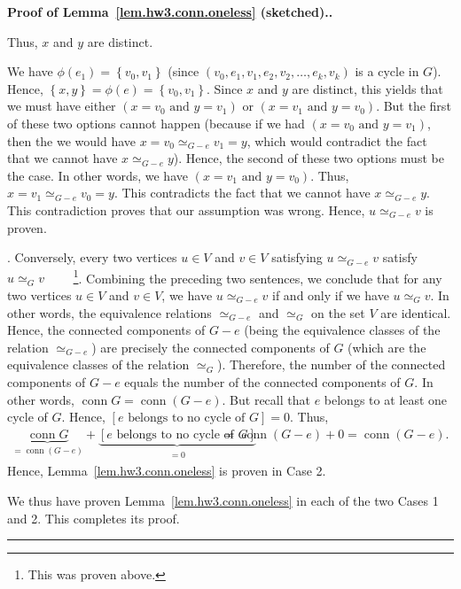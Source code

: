 \documentclass[numbers=enddot,12pt,final,onecolumn,notitlepage]{scrartcl}%
\theoremstyle{definition}
\newenvironment{proof}[1][Proof]{\noindent\textbf{#1.} }{\ \rule{0.5em}{0.5em}}
\newcommand{\conn}{\operatorname{conn}}
\newcommand{\set}[1]{\left\{ #1 \right\}}
\newcommand{\tup}[1]{\left( #1 \right)}
\newcommand{\ive}[1]{\left[ #1 \right]}
\newcommand{\underbrack}[2]{\underbrace{#1}_{\substack{#2}}}
\begin{document}
\begin{proof}[Proof of Lemma~\ref{lem.hw3.conn.oneless} (sketched).]
\begin{itemize}
{        Thus, $x$ and $y$ are distinct.
        \par We have $\phi\tup{e_1} = \set{v_0, v_1}$ (since
        $\tup{v_0, e_1, v_1, e_2, v_2, \ldots, e_k, v_k}$ is a cycle
        in $G$).
        Hence, $\set{x, y} = \phi\tup{e} = \set{v_0, v_1}$.
        Since $x$ and $y$ are distinct, this yields that we must have
        either $\tup{x = v_0 \text{ and } y = v_1}$ or
        $\tup{x = v_1 \text{ and } y = v_0}$.
        But the first of these two options cannot happen (because if
        we had $\tup{x = v_0 \text{ and } y = v_1}$, then the
        we would have $x = v_0 \simeq_{G - e} v_1 = y$, which would
        contradict the fact that we cannot have
        $x \simeq_{G - e} y$).
        Hence, the second of these two options must be the case.
        In other words, we have $\tup{x = v_1 \text{ and } y = v_0}$.
        Thus, $x = v_1 \simeq_{G - e} v_0 = y$.
        This contradicts the fact that we cannot have
        $x \simeq_{G - e} y$.
        This contradiction proves that our assumption was wrong.
        Hence, $u \simeq_{G - e} v$ is proven.}.
      Conversely, every two vertices $u \in V$ and $v \in V$
      satisfying $u \simeq_{G - e} v$ satisfy $u \simeq_G v$
      \ \ \ \ \footnote{This was proven above.}.
      Combining the preceding two sentences, we conclude that
      for any two vertices $u \in V$ and $v \in V$, we have
      $u \simeq_{G - e} v$ if and only if we have $u \simeq_G v$.
      In other words, the equivalence relations $\simeq_{G - e}$
      and $\simeq_G$ on the set $V$ are identical.
      Hence, the connected components of $G - e$ (being the
      equivalence classes of the relation $\simeq_{G - e}$)
      are precisely the connected components of $G$ (which
      are the equivalence classes of the relation $\simeq_G$).
      Therefore, the number of the connected components of
      $G - e$ equals the number of the connected components of
      $G$.
      In other words, $\conn G = \conn \tup{G - e}$.
      But recall that $e$ belongs to at least one cycle of $G$.
      Hence, $\ive{e \text{ belongs to no cycle of } G} = 0$.
      Thus,
      \begin{align*}
      \underbrace{\conn G}_{= \conn \tup{G - e}}
         + \underbrack{\ive{e \text{ belongs to no cycle of } G}}
                      {= 0}
      &= \conn \tup{G - e} + 0
      = \conn \tup{G - e} .
      \end{align*}
      Hence, Lemma~\ref{lem.hw3.conn.oneless} is proven in Case 2.
\end{itemize}

We thus have proven Lemma~\ref{lem.hw3.conn.oneless} in each
of the two Cases 1 and 2. This completes its proof.
\end{proof}
\end{document}
